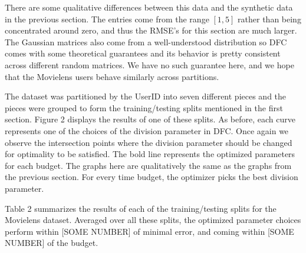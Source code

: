 There are some qualitative differences between this data and the synthetic data in the previous section. The entries come from the range $[1,5]$ rather than being concentrated around zero, and thus the RMSE's for this section are much larger. The Gaussian matrices also come from a well-understood distribution so DFC comes with some theoretical guarantees and its behavior is pretty consistent across different random matrices. We have no such guarantee here, and we hope that the Movielens users behave similarly across partitions. 

The dataset was partitioned by the UserID into seven different pieces and the pieces were grouped to form the training/testing splits mentioned in the first section. Figure 2 displays the results of one of these splits. As before, each curve represents one of the choices of the division parameter in DFC. Once again we observe the intersection points where the division parameter should be changed for optimality to be satisfied. The bold line represents the optimized parameters for each budget. The graphs here are qualitatively the same as the graphs from the previous section. For every time budget, the optimizer picks the best division parameter. 

Table 2 summarizes the results of each of the training/testing splits for the Movielens dataset. Averaged over all these splits, the optimized parameter choices perform within [SOME NUMBER] of minimal error, and coming within [SOME NUMBER] of the budget.

